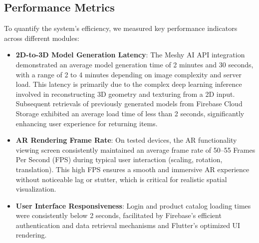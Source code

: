 \documentclass[12pt, a4paper]{article}
\begin{document}
\subsection{Performance Metrics}
To quantify the system's efficiency, we measured key performance indicators across different modules:
\begin{itemize}
    \item \textbf{2D-to-3D Model Generation Latency}: The Meshy AI API integration demonstrated an average model generation time of 2 minutes and 30 seconds, with a range of 2 to 4 minutes depending on image complexity and server load. This latency is primarily due to the complex deep learning inference involved in reconstructing 3D geometry and texturing from a 2D input. Subsequent retrievals of previously generated models from Firebase Cloud Storage exhibited an average load time of less than 2 seconds, significantly enhancing user experience for returning items.
    \item \textbf{AR Rendering Frame Rate}: On tested devices, the AR functionality viewing screen consistently maintained an average frame rate of 50--55 Frames Per Second (FPS) during typical user interaction (scaling, rotation, translation). This high FPS ensures a smooth and immersive AR experience without noticeable lag or stutter, which is critical for realistic spatial visualization.
    \item \textbf{User Interface Responsiveness}: Login and product catalog loading times were consistently below 2 seconds, facilitated by Firebase's efficient authentication and data retrieval mechanisms and Flutter's optimized UI rendering.
\end{itemize}
\end{document}
